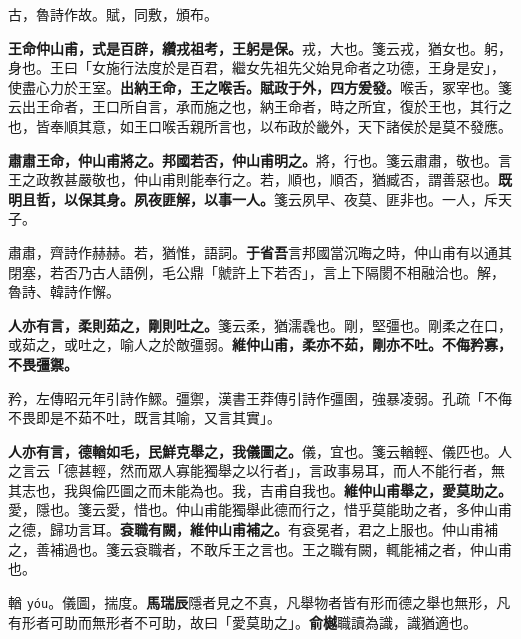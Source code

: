 \begin{quoting}古，魯詩作故。賦，同敷，頒布。\end{quoting}

\textbf{王命仲山甫，式是百辟，纘戎祖考，王躬是保。}{\footnotesize 戎，大也。箋云戎，猶女也。躬，身也。王曰「女施行法度於是百君，繼女先祖先父始見命者之功德，王身是安」，使盡心力於王室。}\textbf{出納王命，王之喉舌。賦政于外，四方爰發。}{\footnotesize 喉舌，冢宰也。箋云出王命者，王口所自言，承而施之也，納王命者，時之所宜，復於王也，其行之也，皆奉順其意，如王口喉舌親所言也，以布政於畿外，天下諸侯於是莫不發應。}

\textbf{肅肅王命，仲山甫將之。邦國若否，仲山甫明之。}{\footnotesize 將，行也。箋云肅肅，敬也。言王之政教甚嚴敬也，仲山甫則能奉行之。若，順也，順否，猶臧否，謂善惡也。}\textbf{既明且哲，以保其身。夙夜匪解，以事一人。}{\footnotesize 箋云夙早、夜莫、匪非也。一人，斥天子。}

\begin{quoting}肅肅，齊詩作赫赫。若，猶惟，語詞。\textbf{于省吾}言邦國當沉晦之時，仲山甫有以通其閉塞，若否乃古人語例，毛公鼎「虩許上下若否」，言上下隔閡不相融洽也。解，魯詩、韓詩作懈。\end{quoting}

\textbf{人亦有言，柔則茹之，剛則吐之。}{\footnotesize 箋云柔，猶濡毳也。剛，堅彊也。剛柔之在口，或茹之，或吐之，喻人之於敵彊弱。}\textbf{維仲山甫，柔亦不茹，剛亦不吐。不侮矜寡，不畏彊禦。}

\begin{quoting}矜，左傳昭元年引詩作鰥。彊禦，漢書王莽傳引詩作彊圉，強暴凌弱。孔疏「不侮不畏即是不茹不吐，既言其喻，又言其實」。\end{quoting}

\textbf{人亦有言，德輶如毛，民鮮克舉之，我儀圖之。}{\footnotesize 儀，宜也。箋云輶輕、儀匹也。人之言云「德甚輕，然而眾人寡能獨舉之以行者」，言政事易耳，而人不能行者，無其志也，我與倫匹圖之而未能為也。我，吉甫自我也。}\textbf{維仲山甫舉之，愛莫助之。}{\footnotesize 愛，隱也。箋云愛，惜也。仲山甫能獨舉此德而行之，惜乎莫能助之者，多仲山甫之德，歸功言耳。}\textbf{袞職有闕，維仲山甫補之。}{\footnotesize 有袞冕者，君之上服也。仲山甫補之，善補過也。箋云袞職者，不敢斥王之言也。王之職有闕，輒能補之者，仲山甫也。}

\begin{quoting}輶 \texttt{yóu}。儀圖，揣度。\textbf{馬瑞辰}隱者見之不真，凡舉物者皆有形而德之舉也無形，凡有形者可助而無形者不可助，故曰「愛莫助之」。\textbf{俞樾}職讀為識，識猶適也。\end{quoting}

